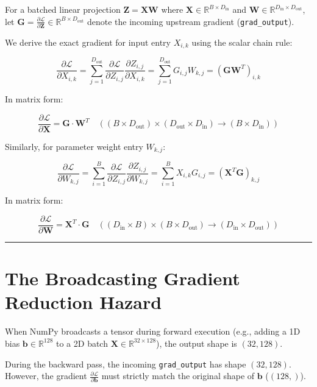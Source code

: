 \documentclass[
  letterpaper,
]{scrbook}
\begin{document}
For a batched linear projection \(\mathbf{Z} = \mathbf{X} \mathbf{W}\)
where \(\mathbf{X} \in \mathbb{R}^{B \times D_{\text{in}}}\) and
\(\mathbf{W} \in \mathbb{R}^{D_{\text{in}} \times D_{\text{out}}}\), let
\(\mathbf{G} = \frac{\partial \mathcal{L}}{\partial \mathbf{Z}} \in \mathbb{R}^{B \times D_{\text{out}}}\)
denote the incoming upstream gradient (\texttt{grad\_output}).

We derive the exact gradient for input entry \(X_{i,k}\) using the
scalar chain rule:

\[\frac{\partial \mathcal{L}}{\partial X_{i,k}} = \sum_{j=1}^{D_{\text{out}}} \frac{\partial \mathcal{L}}{\partial Z_{i,j}} \frac{\partial Z_{i,j}}{\partial X_{i,k}} = \sum_{j=1}^{D_{\text{out}}} G_{i,j} W_{k,j} = (\mathbf{G} \mathbf{W}^T)_{i,k}\]

In matrix form:

\[\frac{\partial \mathcal{L}}{\partial \mathbf{X}} = \mathbf{G} \cdot \mathbf{W}^T \quad \left( (B \times D_{\text{out}}) \times (D_{\text{out}} \times D_{\text{in}}) \to (B \times D_{\text{in}}) \right)\]

Similarly, for parameter weight entry \(W_{k,j}\):

\[\frac{\partial \mathcal{L}}{\partial W_{k,j}} = \sum_{i=1}^B \frac{\partial \mathcal{L}}{\partial Z_{i,j}} \frac{\partial Z_{i,j}}{\partial W_{k,j}} = \sum_{i=1}^B X_{i,k} G_{i,j} = (\mathbf{X}^T \mathbf{G})_{k,j}\]

In matrix form:

\[\frac{\partial \mathcal{L}}{\partial \mathbf{W}} = \mathbf{X}^T \cdot \mathbf{G} \quad \left( (D_{\text{in}} \times B) \times (B \times D_{\text{out}}) \to (D_{\text{in}} \times D_{\text{out}}) \right)\]

\begin{center}\rule{0.5\linewidth}{0.5pt}\end{center}

\section{The Broadcasting Gradient Reduction
Hazard}\label{the-broadcasting-gradient-reduction-hazard}

When NumPy broadcasts a tensor during forward execution (e.g., adding a
1D bias \(\mathbf{b} \in \mathbb{R}^{128}\) to a 2D batch
\(\mathbf{X} \in \mathbb{R}^{32 \times 128}\)), the output shape is
\((32, 128)\).

During the backward pass, the incoming \texttt{grad\_output} has shape
\((32, 128)\). However, the gradient
\(\frac{\partial \mathcal{L}}{\partial \mathbf{b}}\) must strictly match
the original shape of \(\mathbf{b}\) (\((128,)\)).
\end{document}
